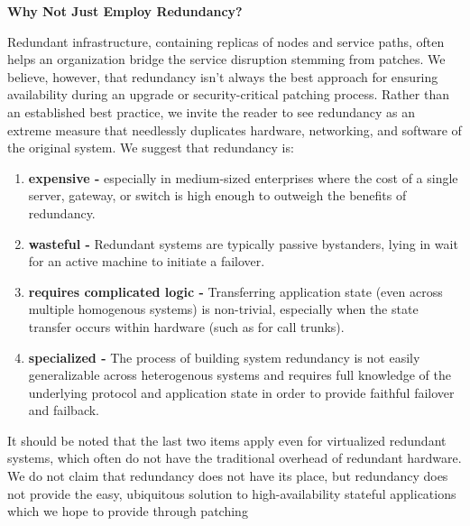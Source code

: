 {\bf Why Not Just Employ Redundancy?}
\label{ssec:redundancy}

Redundant infrastructure, containing replicas of nodes and service
paths, often helps an organization bridge the service disruption
stemming from patches.  We believe, however, that redundancy isn't
always the best approach for ensuring availability during an upgrade
or security-critical patching process.  Rather than an established
best practice, we invite the reader to see redundancy as
an extreme measure that needlessly duplicates hardware, networking, and
software of the original system. We suggest that redundancy is: 


\renewcommand{\labelenumi}{\alph{enumi}.}

\begin{enumerate}
\item {\bf expensive -} especially in medium-sized enterprises where
  the cost of a single server, gateway, or switch is high enough to
  outweigh the benefits of redundancy.

\item {\bf wasteful -} Redundant systems are typically passive
  bystanders, lying in wait for an active machine to
  initiate a failover.

\item {{\bf requires complicated logic -}} Transferring application
  state (even across multiple homogenous systems) is non-trivial,
  especially when the state transfer occurs within hardware (such as
  for call trunks).

\item {{\bf specialized -}} The process of building system redundancy
  is not easily generalizable across heterogenous systems and requires
  full knowledge of the underlying protocol and application state in
  order to provide faithful failover and failback.
\end{enumerate}

It should be noted that the last two items apply even for virtualized
redundant systems, which often do not have the traditional overhead of
redundant hardware.  We do not claim that redundancy does not have its
place, but redundancy does not provide the easy, ubiquitous solution to
high-availability stateful applications which we hope to provide
through patching

